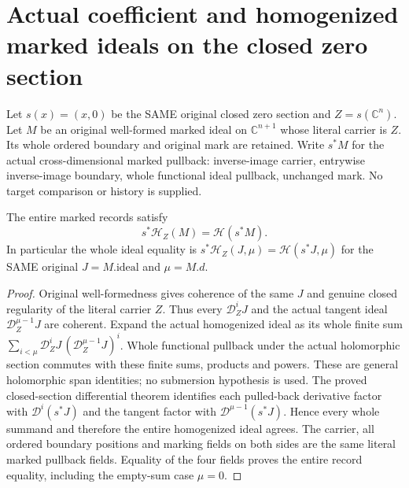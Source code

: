 \section{Actual coefficient and homogenized marked ideals on the closed zero section}

Let $s(x)=(x,0)$ be the SAME original closed zero section and $Z=s(\mathbb C^n)$. Let $M$ be an original well-formed marked ideal on $\mathbb C^{n+1}$ whose literal carrier is $Z$. Its whole ordered boundary and original mark are retained. Write $s^*M$ for the actual cross-dimensional marked pullback: inverse-image carrier, entrywise inverse-image boundary, whole functional ideal pullback, unchanged mark. No target comparison or history is supplied.

\begin{theorem}
\label{hir:actual-zero-section-whole-homogenized-marked}
\leanok
The entire marked records satisfy
\[
 s^*\mathcal H_Z(M)=\mathcal H(s^*M).
\]
In particular the whole ideal equality is
$s^*\mathcal H_Z(J,\mu)=\mathcal H(s^*J,\mu)$ for the SAME original $J=M.\mathrm{ideal}$ and $\mu=M.d$.
\end{theorem}
\begin{proof}
Original well-formedness gives coherence of the same $J$ and genuine closed regularity of the literal carrier $Z$. Thus every $\mathcal D_Z^iJ$ and the actual tangent ideal $\mathcal D_Z^{\mu-1}J$ are coherent. Expand the actual homogenized ideal as its whole finite sum
$\sum_{i<\mu}\mathcal D_Z^iJ\,(\mathcal D_Z^{\mu-1}J)^i$.
Whole functional pullback under the actual holomorphic section commutes with these finite sums, products and powers. These are general holomorphic span identities; no submersion hypothesis is used. The proved closed-section differential theorem identifies each pulled-back derivative factor with $\mathcal D^i(s^*J)$ and the tangent factor with $\mathcal D^{\mu-1}(s^*J)$. Hence every whole summand and therefore the entire homogenized ideal agrees. The carrier, all ordered boundary positions and marking fields on both sides are the same literal marked pullback fields. Equality of the four fields proves the entire record equality, including the empty-sum case $\mu=0$.
\end{proof}

